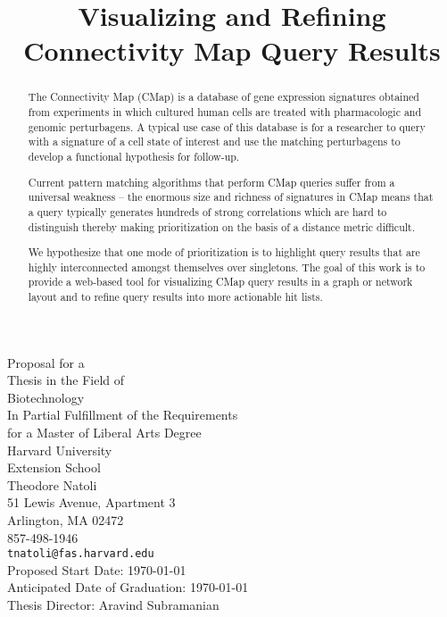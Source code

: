 \documentclass[12pt]{article}
\begin{document}
\title{Visualizing and Refining Connectivity Map Query Results}
\maketitle
\begin{titlepage}
\begin{center}
Proposal for a\\
Thesis in the Field of\\
Biotechnology\\[\baselineskip]
In Partial Fulfillment of the Requirements\\
for a Master of Liberal Arts Degree\\[\baselineskip]
Harvard University\\
Extension School\\[\baselineskip]
Theodore Natoli\\
51 Lewis Avenue, Apartment 3\\
Arlington, MA 02472\\
857-498-1946\\
\texttt{tnatoli@fas.harvard.edu}\\[\baselineskip]
Proposed Start Date: \today\\
Anticipated Date of Graduation: \today\\
Thesis Director: Aravind Subramanian
\end{center}
\end{titlepage}

\begin{abstract}
The Connectivity Map (CMap) is a database of gene expression signatures obtained from experiments in which cultured human cells are treated with pharmacologic and genomic perturbagens. A typical use case of this database is for a researcher to query with a signature of a cell state of interest and use the matching perturbagens to develop a functional hypothesis for follow-up. 

Current pattern matching algorithms that perform CMap queries suffer from a universal weakness -- the enormous size and richness of signatures in CMap means that a query typically generates hundreds of strong correlations which are hard to distinguish thereby making prioritization on the basis of a distance metric difficult.

We hypothesize that one mode of prioritization is to highlight query results that are highly interconnected amongst themselves over singletons. The goal of this work is to provide a web-based tool for visualizing CMap query results in a graph or network layout and to refine query results into more actionable hit lists.
\end{abstract}
\end{document}
